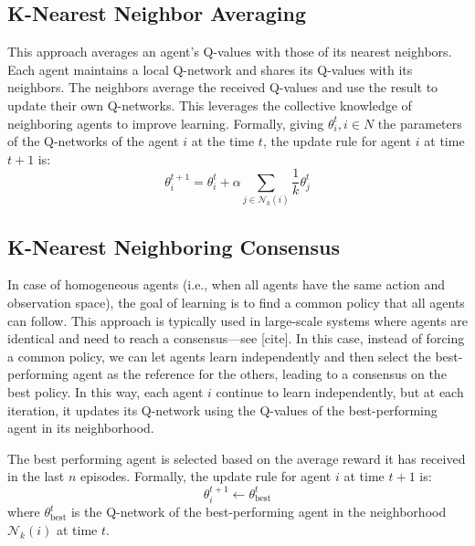 \documentclass[sigconf]{acmart}
\begin{document}
\subsection{K-Nearest Neighbor Averaging}
This approach averages an agent's Q-values with those of its nearest neighbors. 
Each agent maintains a local Q-network and shares its Q-values with its neighbors. 
The neighbors average the received Q-values and use the result to update their own Q-networks. 
This leverages the collective knowledge of neighboring agents to improve learning.
%
Formally, giving $\theta^t_i, i \in N$ the parameters of the Q-networks of the agent $i$ at the time $t$,
the update rule for agent $i$ at time $t+1$ is:
\begin{equation}
  \theta^{t+1}_i = \theta^t_i + \alpha \sum_{j \in \mathcal{N}_k(i)} \frac{1}{k} \theta^t_j
\end{equation}

\subsection{K-Nearest Neighboring Consensus}
In case of homogeneous agents (i.e., when all agents have the same action and observation space),
the goal of learning is to find a common policy that all agents can follow.
This approach is typically used in large-scale systems where agents are identical and need to reach a consensus---see [cite].
%
In this case, instead of forcing a common policy, we can let agents learn independently and then select the best-performing agent as the reference for the others, leading to a consensus on the best policy.
%
In this way, each agent $i$ continue to learn independently, but at each iteration, it updates its Q-network using the Q-values of the best-performing agent in its neighborhood.

The best performing agent is selected based on the average reward it has received in the last $n$ episodes.
Formally, the update rule for agent $i$ at time $t+1$ is:
\begin{equation}
  \theta^{t+1}_i \leftarrow \theta^t_{\text{best}}
\end{equation}
where $\theta^t_{\text{best}}$ is the Q-network of the best-performing agent in the neighborhood $\mathcal{N}_k(i)$ at time $t$.
\end{document}
